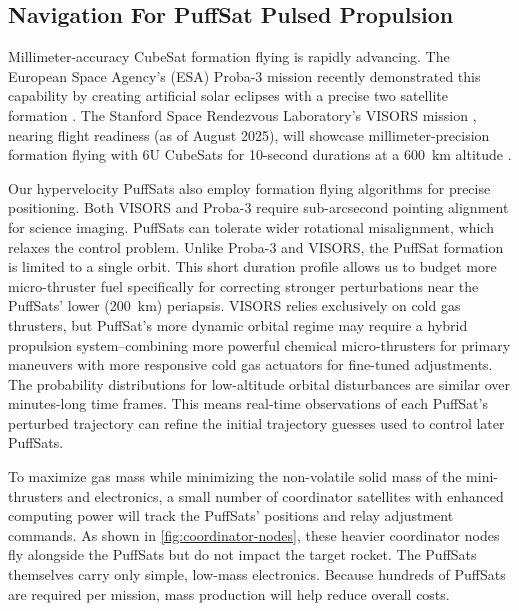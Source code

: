 \documentclass{article}
\begin{document}
\subsection{Navigation For PuffSat Pulsed Propulsion}\label{sec:neural_navigation}
Millimeter-accuracy CubeSat formation flying is rapidly advancing. The European Space Agency's (ESA) Proba-3 mission recently demonstrated this capability by creating artificial solar eclipses with a precise two satellite formation \cite{esa_proba_3}. The Stanford Space Rendezvous Laboratory's VISORS mission \cite{guffanti2023autonomous}, nearing flight readiness (as of August 2025), will showcase millimeter-precision formation flying with 6U CubeSats for 10-second durations at a \SI{600}{\kilo\meter} altitude \cite{visors_formation_flying}.

Our hypervelocity PuffSats also employ formation flying algorithms for precise positioning.    Both VISORS and Proba-3 require sub-arcsecond pointing alignment for science imaging.   PuffSats can tolerate wider rotational misalignment, which relaxes the control problem.  Unlike Proba-3 and VISORS, the PuffSat formation is limited to a single orbit. This short duration profile allows us to budget more micro-thruster fuel specifically for correcting stronger perturbations near the PuffSats' lower (\SI{200}{\kilo\meter}) periapsis. VISORS relies exclusively on cold gas thrusters, but PuffSat’s more dynamic orbital regime may require a hybrid propulsion system--combining more powerful chemical micro-thrusters for primary maneuvers with more responsive cold gas actuators for fine-tuned adjustments.  The probability distributions for low-altitude orbital disturbances are similar over minutes-long time frames. This means real-time observations of each PuffSat’s perturbed trajectory can refine the initial trajectory guesses used to control later PuffSats.

To maximize gas mass while minimizing the non-volatile solid mass of the mini-thrusters and electronics, a small number of coordinator satellites with enhanced computing power will track the PuffSats' positions and relay adjustment commands. As shown in \autoref{fig:coordinator-nodes}, these heavier coordinator nodes fly alongside the PuffSats but do not impact the target rocket. The PuffSats themselves carry only simple, low-mass electronics. Because hundreds of PuffSats are required per mission, mass production will help reduce overall costs.
\end{document}
